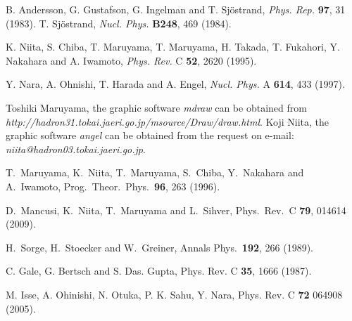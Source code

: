 \documentclass[]{article}
\def\Journal#1#2#3#4{{#1} {\bf #2}, #3 (#4)}
\def\NP{\em Nucl. Phys.}
\def\NPA{{\em Nucl. Phys.} A}
\def\PR{{\em Phys. Rev.}}
\def\PRC{{\em Phys. Rev.} C}
\def\PR{{\em Phys. Rep.}}
\begin{document}
\begin{thebibliography}{20}
  B. Andersson, G. Gustafson, G. Ingelman and T. Sj\"ostrand,
     \Journal{\PR}{97}{31}{1983}.
  T. Sj\"ostrand,
     \Journal{\NP}{B248}{469}{1984}.



K. Niita, S. Chiba, T. Maruyama, T. Maruyama, H. Takada, T. Fukahori,
 Y. Nakahara and A. Iwamoto,
    \Journal{\PRC}{52}{2620}{1995}.

   Y. Nara, A. Ohnishi, T. Harada and A. Engel,
    \Journal{\NPA}{614}{433}{1997}.

   Toshiki Maruyama, the graphic software {\it mdraw} can be obtained
   from \\
{\em http://hadron31.tokai.jaeri.go.jp/msource/Draw/draw.html}.
   Koji Niita, the graphic software {\it angel} can be obtained
   from the request on e-mail: {\em niita@hadron03.tokai.jaeri.go.jp}.


  T.~Maruyama, K.~Niita, T.~Maruyama, S.~Chiba, Y.~Nakahara and A.~Iwamoto,
  Prog.\ Theor.\ Phys.\  {\bf 96}, 263 (1996).


  D.~Mancusi, K.~Niita, T.~Maruyama and L.~Sihver,
  Phys.\ Rev.\ C {\bf 79}, 014614 (2009).

H.~Sorge, H.~Stoecker and W.~Greiner,
Annals Phys.\  {\bf 192}, 266 (1989).

C. Gale, G. Bertsch and S. Das. Gupta,
Phys. Rev. C {\bf 35}, 1666 (1987).

M. Isse, A. Ohinishi, N. Otuka, P. K. Sahu, Y. Nara,
Phys. Rev. C {\bf72} 064908 (2005).


\end{thebibliography}
\end{document}
